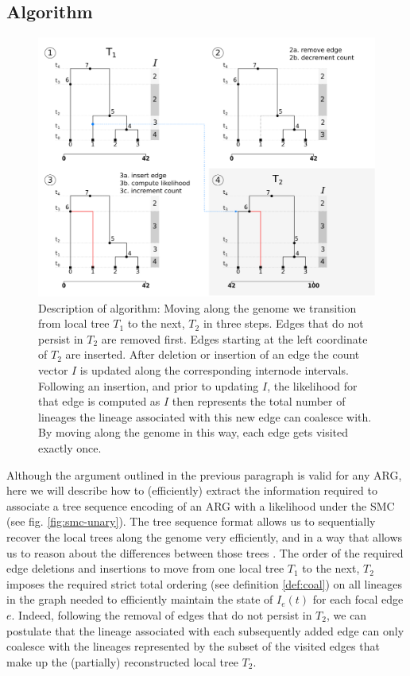 \documentclass{article}
\begin{document}
\subsection{Algorithm} \label{par:algo}

\begin{figure}[!ht]
\centering
\includegraphics[width=\textwidth]{figures/ts_algo_2rows.png}
\caption{Description of algorithm: Moving along the genome we transition from
local tree $T_1$ to the next, $T_2$ in three steps. 
Edges that do not persist in $T_2$ are
removed first. Edges starting at the left coordinate of $T_2$ are inserted.
After deletion or insertion of an edge the count vector $I$ is updated along the
corresponding internode intervals. Following an insertion, and prior to updating $I$,
the likelihood for that edge is computed as $I$ then represents the total number of
lineages the lineage associated with this new edge can
coalesce with. By moving along the genome in this way, each edge gets visited exactly once.}
\label{fig:algo}
\end{figure}

Although the argument outlined in the previous paragraph is valid for any ARG, here we
will describe how to (efficiently) extract the information required to associate a
tree sequence encoding of an ARG with a likelihood under the SMC (see fig. \ref{fig:smc-unary}).
The tree sequence format allows us to sequentially recover the local trees
along the genome very efficiently, and in a way that allows us to reason about
the differences between those trees \citep{kelleher_efficient_2016, ralph_efficiently_2020}.
The order of the required edge deletions and insertions to move from one local tree $T_1$ to
the next, $T_2$ imposes the required strict total ordering
(see definition \ref{def:coal}) on all
lineages in the graph needed to efficiently maintain the state of $I_e(t)$ for each focal edge $e$.
Indeed, following the removal of edges that do not persist in $T_2$,
we can postulate that the lineage associated with each subsequently added edge
can only coalesce with the lineages represented by the subset of the
visited edges that make up the (partially) reconstructed local tree $T_2$.
\end{document}
